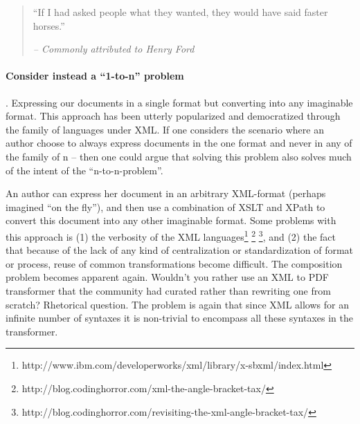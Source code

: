 \documentclass{scrreprt}
\begin{document}
\begin{quote}
``If I had asked people what they wanted, they would have said faster horses.''
\begin{flushright}
\textit{-- Commonly attributed to Henry Ford}
\end{flushright}
\end{quote}


\paragraph{Consider instead a ``1-to-n'' problem}. Expressing our documents in a single format but converting into any imaginable format. This approach has been utterly popularized and democratized through the family of languages under XML. If one considers the scenario where an author choose to always express documents in the one format and never in any of the family of n -- then one could argue that solving this problem also solves much of the intent of the ``n-to-n-problem''.

An author can express her document in an arbitrary XML-format (perhaps imagined ``on the fly''), and then use a combination of XSLT and XPath to convert this document into any other imaginable format. Some problems with this approach is (1) the verbosity of the XML languages\footnote{http://www.ibm.com/developerworks/xml/library/x-sbxml/index.html} \footnote{http://blog.codinghorror.com/xml-the-angle-bracket-tax/} \footnote{http://blog.codinghorror.com/revisiting-the-xml-angle-bracket-tax/}, and (2) the fact that because of the lack of any kind of centralization or standardization of format or process, reuse of common transformations become difficult. The composition problem becomes apparent again. Wouldn't you rather use an XML to PDF transformer that the community had curated rather than rewriting one from scratch? Rhetorical question. The problem is again that since XML allows for an infinite number of syntaxes it is non-trivial to encompass all these syntaxes in the transformer.
\end{document}
